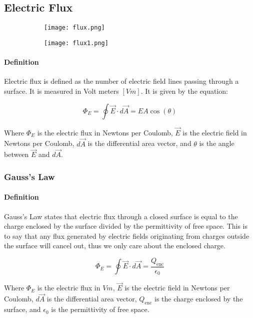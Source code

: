 \subsection{Electric Flux}
\hrulefill

\begin{figure}[h]
    \centering
    \begin{subfigure}{0.4\textwidth}
        \centering
        \texttt{[image: flux.png]}
    \end{subfigure}%
    \hspace{0.1\textwidth}
    \begin{subfigure}{0.4\textwidth}
        \centering
        \texttt{[image: flux1.png]}
    \end{subfigure}
\end{figure}

\paragraph*{Definition}
Electric flux is defined as the number of electric field lines passing through a surface. It is measured in Volt meters $[Vm]$.
It is given by the equation:

\begin{equation*}
    \Phi_E = \oint \vec{E} \cdot d\vec{A} = EA\cos(\theta)
\end{equation*}

Where $\Phi_E$ is the electric flux in Newtons per Coulomb, $\vec{E}$ is the electric field in Newtons per Coulomb, $d\vec{A}$ is the differential area vector, and 
$\theta$ is the angle between $\vec{E}$ and $d\vec{A}$.

\hrulefill

\subsubsection*{Gauss's Law}
\paragraph*{Definition}
Gauss's Law states that electric flux through a closed surface is equal to the charge enclosed by the surface divided by the permittivity of free space. This is to say that
any flux generated by electric fields originating from charges outside the surface will cancel out, thus we only care about the enclosed charge.

\begin{equation*}
    \Phi_E = \oint \vec{E} \cdot d\vec{A} = \frac{Q_{\text{enc}}}{\epsilon_0}
\end{equation*}

Where $\Phi_E$ is the electric flux in $Vm$, $\vec{E}$ is the electric field in Newtons per Coulomb, $d\vec{A}$ is the differential area vector, $Q_{\text{enc}}$ 
is the charge enclosed by the surface, and $\epsilon_0$ is the permittivity of free space.